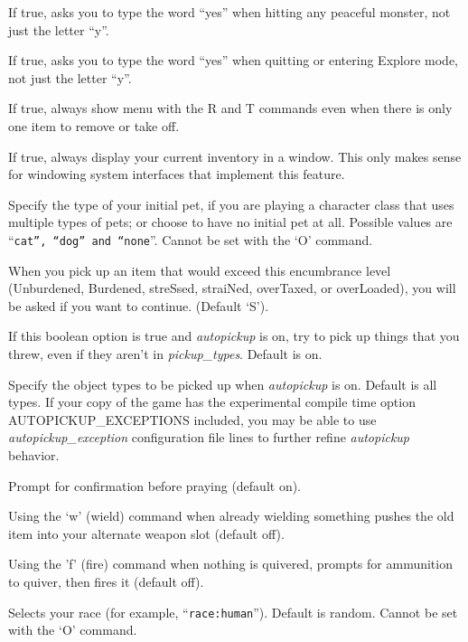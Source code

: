 If true, asks you to type the word ``yes'' when hitting any peaceful
monster, not just the letter ``y''.
\item[\ib{paranoid\_quit}]
If true, asks you to type the word ``yes'' when quitting or entering
Explore mode, not just the letter ``y''.
\item[\ib{paranoid\_remove}]
If true, always show menu with the R and T commands even when there is
only one item to remove or take off.
\item[\tb{perm\_invent}]
If true, always display your current inventory in a window.  This only
makes sense for windowing system interfaces that implement this feature.
\item[\tb{pettype}]
Specify the type of your initial pet, if you are playing a character class
that uses multiple types of pets; or choose to have no initial pet at all.
Possible values are ``{\tt cat'', ``dog'' and ``none}''.
Cannot be set with the `O' command.
\item[\tb{pickup\_burden}]
When you pick up an item that would exceed this encumbrance
level (Unburdened, Burdened, streSsed, straiNed, overTaxed,
or overLoaded), you will be asked if you want to continue.
(Default `S').
\item[\ib{pickup\_thrown}]
If this boolean option is true and {\it autopickup\/} is on, try to pick up
things that you threw, even if they aren't in {\it pickup\_types\/}.
Default is on.
\item[\tb{pickup\_types}]
Specify the object types to be picked up when
{\it autopickup }
is on.  Default is all types.  If your copy of the game has the experimental
compile time option AUTOPICKUP\_EXCEPTIONS included, you may be able to use 
{\it autopickup\_exception }
configuration file lines to further refine
{\it autopickup }
behavior.
\item[\tb{prayconfirm}]
Prompt for confirmation before praying (default on).
\item[\tb{pushweapon}]
Using the `w' (wield) command when already wielding
something pushes the old item into your alternate weapon slot (default off).
\item[\ib{quiver_fired}]
Using the 'f' (fire) command when nothing is quivered, prompts for ammunition 
to quiver, then fires it (default off).
\item[\tb{race}]
Selects your race (for example, ``{\tt race:human}'').  Default is random.
Cannot be set with the `O' command.
\item[\tb{rest\_on\_space}]

